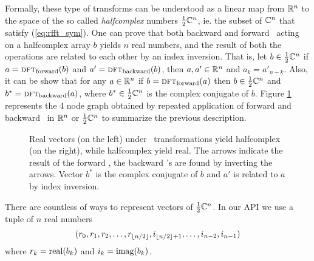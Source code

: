 Formally, these type of transforms can be understood as a linear map from $\mathbb{R}^n$ to the
space of the so called \emph{halfcomplex} numbers $\frac{1}{2}\mathbb{C}^n$, ie.
the subset of $\mathbb{C}^n$ that satisfy (\ref{eq:rfft_sym}).
One can prove that both backward and forward \dft\ acting on a halfcomplex array
$b$ yields $n$ real numbers, and the result of both the operations are related to
each other by an index inversion. That is, let $b\in \frac{1}{2}\mathbb{C}^n$ if 
$a = \textsc{dft}_{\textrm{forward}}(b)$ and 
$a' =\textsc{dft}_{\textrm{backward}}(b)$, then $a,a'\in \mathbb{R}^n$ and $a_k = a'_{n-k}$.
Also, it can be show that for any $a\in\mathbb{R}^n$ if $b=\textsc{dft}_{\textrm{forward}}(a)$ then
$b\in\frac{1}{2}\mathbb{C}^n$ and $b^* = \textsc{dft}_{\textrm{backward}}(a)$, where $b^*\in\frac{1}{2}\mathbb{C}^n$ is the complex
conjugate of $b$.
Figure \ref{fig:halfcomplex}
represents the 4 node graph obtained by repeated application of forward and
backward \dft\ in $\mathbb{R}^n$ or $\frac{1}{2}\mathbb{C}^n$ to summarize the previous
description.
\begin{figure}
    \centering
    \caption{Real vectors (on the left) under \dft\ transformations yield
    halfcomplex (on the right),
    while halfcomplex yield real. The arrows indicate the result of the forward
    \dft, the backward \dft's are found by inverting the arrows. Vector $b^*$ is
    the complex conjugate of $b$ and $a'$ is related to $a$ by index inversion.}
    \label{fig:halfcomplex}
\end{figure}

There are countless of ways to represent vectors of $\frac{1}{2}\mathbb{C}^n$.
In our API we use a tuple of $n$ real numbers
\[ 
    (r_0,r_1,r_2,\ldots,r_{ \lfloor n/2 \rfloor },i_{\lfloor n/2 \rfloor+1},\ldots,i_{n-2},i_{n-1})
\]
where $r_k = \operatorname{real}(b_k)$ and $i_k = \operatorname{imag}(b_k)$.

% 
% 

